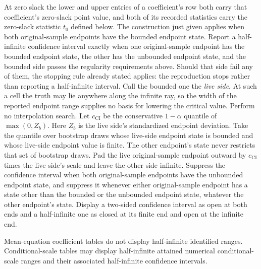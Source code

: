 \documentclass[11pt]{article}
\begin{document}
At zero slack the lower and upper entries of a coefficient's row both carry that coefficient's
zero-slack point value, and both of its recorded statistics carry the zero-slack statistic \(t_0\)
defined below.
The construction just given applies when both original-sample endpoints have the bounded endpoint
state. Report a half-infinite confidence interval exactly when one original-sample endpoint has the
bounded endpoint state, the other has the unbounded endpoint state, and the bounded side passes the
regularity requirements above. Should that side fail any of them, the stopping rule already stated
applies: the reproduction stops rather than reporting a half-infinite interval. Call the bounded one the
\emph{live side}. At such a cell the truth may lie anywhere along the infinite ray, so the width of the reported
endpoint range supplies no basis for lowering the critical value. Perform no interpolation search. Let \(c_{\mathrm{CI}}\) be the conservative
\(1-\alpha\) quantile of \(\max(0,Z_b)\). Here \(Z_b\) is the live side's standardized endpoint
deviation. Take the quantile over bootstrap draws whose live-side endpoint state is bounded and
whose live-side endpoint value is finite. The other endpoint's state
never restricts that set of bootstrap draws. Pad the live original-sample endpoint outward by
\(c_{\mathrm{CI}}\) times the live side's scale and leave the other side infinite. Suppress the
confidence interval when both original-sample endpoints have the unbounded endpoint state, and
suppress it whenever either original-sample endpoint has a state other than the bounded or the unbounded endpoint state,
whatever the other endpoint's state. Display a two-sided confidence interval as open at both ends and
a half-infinite one as closed at its finite end and open at the infinite end.

Mean-equation coefficient tables do not display half-infinite identified ranges. Conditional-scale
tables may display half-infinite attained numerical conditional-scale ranges and their associated half-infinite
confidence intervals.
\end{document}
